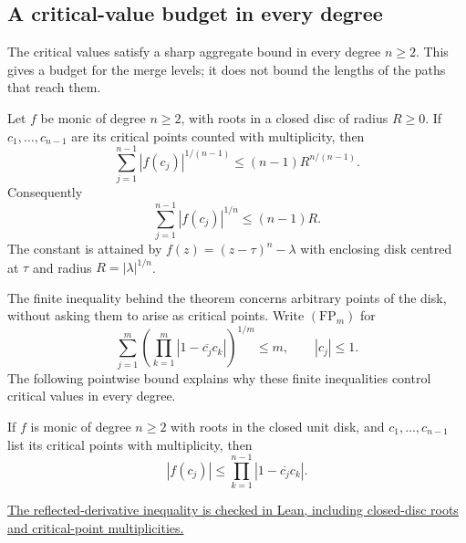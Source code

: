 \documentclass[11pt]{article}
\begin{document}
\subsection*{A critical-value budget in every degree}

The critical values satisfy a sharp aggregate bound in every degree $n\ge2$.  This gives a budget for the merge levels; it does not
bound the lengths of the paths that reach them.

\begin{theorem}
\label{res:critical-value-budget}
Let $f$ be monic of degree $n\ge2$, with roots in a closed disc of radius
$R\ge0$.  If $c_1,\ldots,c_{n-1}$ are its critical points counted with
multiplicity, then
\begin{equation}\label{eq:critical-value-power-budget}
 \sum_{j=1}^{n-1}|f(c_j)|^{1/(n-1)}\le(n-1)R^{n/(n-1)}.
\end{equation}
Consequently
\[
 \sum_{j=1}^{n-1}|f(c_j)|^{1/n}\le(n-1)R.
\]
The constant is attained by $f(z)=(z-\tau)^n-\lambda$ with enclosing
disk centred at $\tau$ and radius $R=|\lambda|^{1/n}$.
\end{theorem}

The finite inequality behind the theorem concerns arbitrary points of the
disk, without asking them to arise as critical points.  Write $(\mathrm{FP}_m)$
for
\[
 \sum_{j=1}^m\left(\prod_{k=1}^m
       |1-\overline{c_j}c_k|\right)^{1/m}\le m,
 \qquad |c_j|\le1.
\]
The following pointwise bound explains why these finite inequalities
control critical values in every degree.

\begin{lemma}\label{res:reflected-critical-value}
If $f$ is monic of degree $n\ge2$ with roots in the closed unit disk,
and $c_1,\ldots,c_{n-1}$ list its critical points with multiplicity, then
\begin{equation}\label{eq:critical-reflected-product}
 |f(c_j)|\le\prod_{k=1}^{n-1}|1-\overline{c_j}c_k|.
\end{equation}
\end{lemma}

\noindent\href{https://github.com/wcook04/plectis-erdos/blob/bb4e24651b37cd096d3749ef299c3317930b3a3b/ErdosProblems/Erdos1041/PaperReflectedCompletion.lean#L254}{The reflected-derivative inequality is checked in Lean, including closed-disc roots and critical-point multiplicities.}
\end{document}
